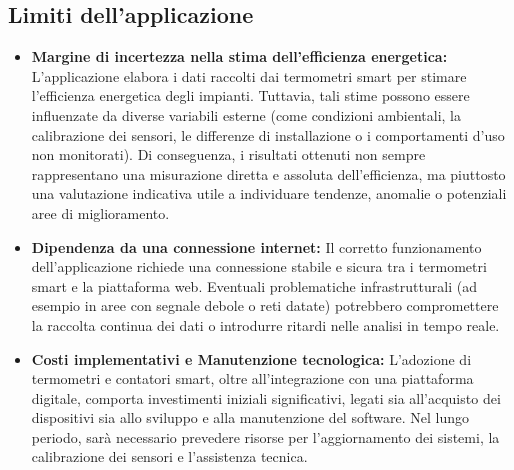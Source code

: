 \subsection{Limiti dell'applicazione}
\begin{itemize}
    \item \textbf{Margine di incertezza nella stima dell’efficienza energetica:} L’applicazione elabora i dati raccolti dai termometri smart per stimare l’efficienza energetica degli impianti. Tuttavia, tali stime possono essere influenzate da diverse variabili esterne (come condizioni ambientali, la calibrazione dei sensori, le differenze di installazione o i comportamenti d’uso non monitorati). Di conseguenza, i risultati ottenuti non sempre rappresentano una misurazione diretta e assoluta dell’efficienza, ma piuttosto una valutazione indicativa utile a individuare tendenze, anomalie o potenziali aree di miglioramento.
    \item \textbf{Dipendenza da una connessione internet:} Il corretto funzionamento dell’applicazione richiede una connessione stabile e sicura tra i termometri smart e la piattaforma web. Eventuali problematiche infrastrutturali (ad esempio in aree con segnale debole o reti datate) potrebbero compromettere la raccolta continua dei dati o introdurre ritardi nelle analisi in tempo reale.
    \item \textbf{Costi implementativi e Manutenzione tecnologica:} L’adozione di termometri e contatori smart, oltre all’integrazione con una piattaforma digitale, comporta investimenti iniziali significativi, legati sia all’acquisto dei dispositivi sia allo sviluppo e alla manutenzione del software. Nel lungo periodo, sarà necessario prevedere risorse per l’aggiornamento dei sistemi, la calibrazione dei sensori e l’assistenza tecnica.
\end{itemize}